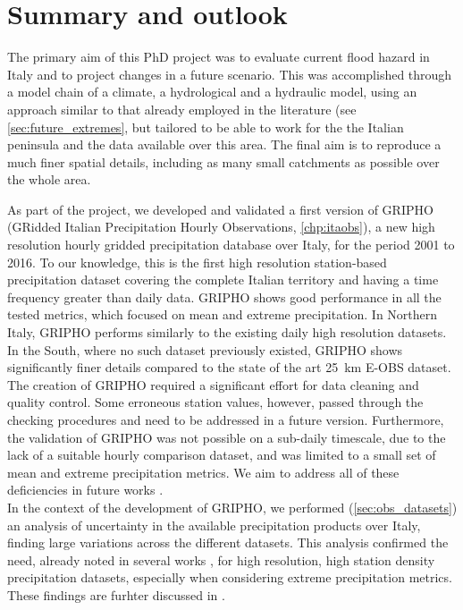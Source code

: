 \chapter{Summary and outlook}\label{chp:conclusions}
The primary aim of this PhD project was to evaluate current flood hazard in Italy and to project changes in a future scenario.
This was accomplished through a model chain of a climate, a hydrological and a hydraulic model, using an approach similar to that already employed in the literature (see \cref{sec:future_extremes}, but tailored to be able to work for the the Italian peninsula  and the data available over this area. The final aim is  to reproduce a much finer spatial details, including as many small catchments as possible over the whole area.

As part of the project, we developed and validated a first version of GRIPHO (GRidded Italian Precipitation Hourly Observations, \cref{chp:itaobs}), a new high resolution hourly gridded precipitation database over Italy, for the period 2001 to 2016.
To our knowledge, this is the first high resolution station-based precipitation dataset covering the complete Italian territory and having a time frequency greater than daily data.
GRIPHO shows good performance in all the tested metrics, which focused on mean and extreme precipitation. In Northern Italy, GRIPHO performs similarly to the existing daily high resolution datasets. In the South, where no such dataset previously existed, GRIPHO shows significantly finer details compared to the state of the art \SI{25}{\kilo\meter} E-OBS dataset.
The creation of GRIPHO required a significant effort for  data cleaning and quality control.
Some erroneous station values, however, passed through the checking procedures and need to be addressed in a future version.
Furthermore, the validation of GRIPHO was not possible on a sub-daily timescale, due to the lack of a suitable hourly comparison dataset, and was limited to a small set of mean and extreme precipitation metrics.
We aim to address all of these deficiencies in future works \citep[][in preparation]{Fantini2018a}.\\
In the context of the development of GRIPHO, we performed (\cref{sec:obs_datasets}) an analysis of uncertainty in the available precipitation products over Italy, finding large variations across the different datasets.
This analysis confirmed the need, already noted in several works \citep{Fantini2016,Prein2016,Prein2017}, for high resolution, high station density precipitation datasets, especially when considering extreme precipitation metrics.
These findings are furhter discussed in \citet[][in preparation]{Fantini2018}.

